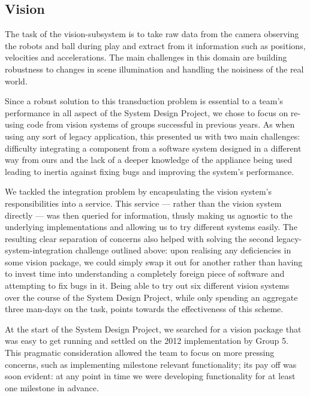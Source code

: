 \documentclass[journal,a4paper,12pt]{IEEEtran}
\begin{document}
\subsection{Vision}\label{s:vision}

The task of the vision-subsystem is to take raw data from the camera observing the robots and ball during play and extract from it information such as positions, velocities and accelerations. The main challenges in this domain are building robustness to changes in scene illumination and handling the noisiness of the real world.

Since a robust solution to this transduction problem is essential to a team's performance in all aspect of the System Design Project, we chose to focus on re-using code from vision systems of groups successful in previous years. As when using any sort of legacy application, this presented us with two main challenges: difficulty integrating a component from a software system designed in a different way from ours and the lack of a deeper knowledge of the appliance being used leading to inertia against fixing bugs and improving the system's performance.

We tackled the integration problem by encapsulating the vision system's responsibilities into a service. This service --- rather than the vision system directly --- was then queried for information, thusly making us agnostic to the underlying implementations and allowing us to try different systems easily. The resulting clear separation of concerns also helped with solving the second legacy-system-integration challenge outlined above: upon realising any deficiencies in some vision package, we could simply swap it out for another rather than having to invest time into understanding a completely foreign piece of software and attempting to fix bugs in it. Being able to try out six different vision systems over the course of the System Design Project, while only spending an aggregate three man-days on the task, points towards the effectiveness of this scheme.

At the start of the System Design Project, we searched for a vision package that was easy to get running and settled on the 2012 implementation by Group 5. This pragmatic consideration allowed the team to focus on more pressing concerns, such as implementing milestone relevant functionality; its pay off was soon evident: at any point in time we were developing functionality for at least one milestone in advance.
\end{document}
